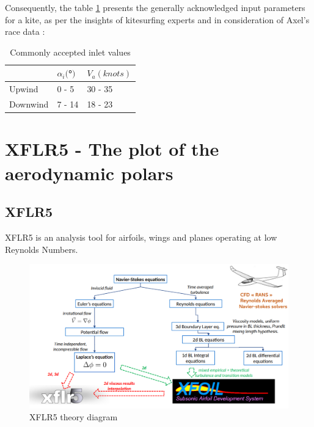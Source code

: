  Consequently, the table \ref{tab:commonly_accepted_inlet_values} presents the generally acknowledged input parameters for a kite, as per the insights of kitesurfing experts and in consideration of Axel's race data :

 \begin{table}[H]
    \center
    \begin{tabular}{|l|l|l|}
        \hline
             & $\alpha_{i} ($°$) $ & $V_{a} (knots) $ \tabularnewline
        \hline
        Upwind & 0 - 5 & 30 - 35  \tabularnewline
        \hline
        Downwind & 7 - 14 & 18 - 23  \tabularnewline
        \hline
    \end{tabular}
    \caption{Commonly accepted inlet values}
    \label{tab:commonly_accepted_inlet_values}
\end{table}


\section{XFLR5 - The plot of the aerodynamic polars}
\label{sec:Ch1.4}


\subsection{XFLR5}
\label{sub:Ch1.4.1}

XFLR5 is an analysis tool for airfoils, wings and planes operating at low Reynolds Numbers.

\begin{figure}[H]
    \centering
    \includegraphics[width=1\linewidth]{figures/2D steady simulations/XFLR5 theory.png}
    \caption{XFLR5 theory diagram}
    \label{fig:XFLR5_theory_diagram}
\end{figure}

